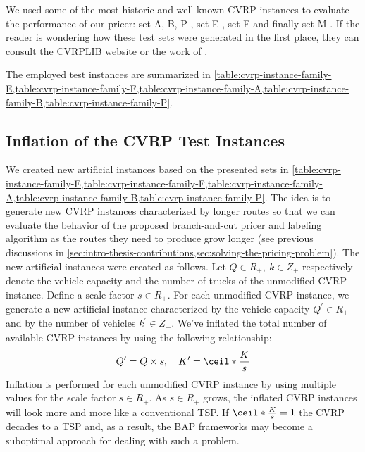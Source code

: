 \medskip

We used some of the most historic and well-known CVRP instances to evaluate the performance of our pricer:
set A, B, P \parencite{augerat1995},
set E \parencite{dantzig1959, christofides1969, gaskell1967bases, gillett1974heuristic},
set F \parencite{fisher1994}
and finally set M \parencite{christofides1979vehicle}.
If the reader is wondering how these test sets were generated in the first place,
they can consult the CVRPLIB website or the work of \textcite{uchoa2017}.

The employed test instances are summarized in
\cref{table:cvrp-instance-family-E,table:cvrp-instance-family-F,table:cvrp-instance-family-A,table:cvrp-instance-family-B,table:cvrp-instance-family-P}.



\subsection{Inflation of the CVRP Test Instances}
\label{sec:inflation-of-the-cvrp-test-instances}

We created new artificial instances based on the presented sets in
\cref{table:cvrp-instance-family-E,table:cvrp-instance-family-F,table:cvrp-instance-family-A,table:cvrp-instance-family-B,table:cvrp-instance-family-P}.
The idea is to generate new CVRP instances characterized by longer routes
so that we can evaluate the behavior of the proposed branch-and-cut pricer and labeling algorithm
as the routes they need to produce grow longer (see previous discussions in
\cref{sec:intro-thesis-contributions,sec:solving-the-pricing-problem}).
The new artificial instances were created as follows.
Let $Q \in R_+,\ k \in Z_+$ respectively denote the vehicle
capacity and the number of trucks of the unmodified CVRP instance.
Define a scale factor $s \in R_+$.
For each unmodified CVRP instance, we generate a new artificial instance
characterized by the vehicle capacity $Q^\prime \in R_+$
and by the number of vehicles $k^\prime \in Z_+$.
We've inflated the total number of available CVRP instances
by using the following relationship:
$$
	Q^\prime = Q \times s, \quad K^\prime = \ceil*{\frac{K}{s}}
$$
Inflation is performed for each unmodified CVRP instance by using
multiple values for the scale factor $s \in R_+$.
As $s \in R_+$ grows, the inflated CVRP instances will look more and more like a conventional TSP.
If $\ceil*{\frac{K}{s}} = 1$ the CVRP decades to a TSP and, as a result,
the BAP frameworks may become a suboptimal approach for dealing with such a problem.

